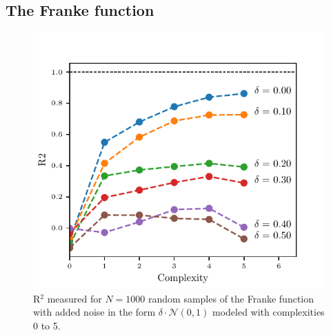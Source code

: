 \documentclass[reprint, english, nofootinbib]{revtex4-2}
\begin{document}
\subsection{The Franke function}

    \begin{figure}[h!tb]
        \center
        \includegraphics[width=\columnwidth]{OLS_R2_noise.pdf}
        \caption{R$^2$ measured for $N=1000$ random samples of the Franke function with added noise in the form $\delta \cdot \mathcal N(0, 1)$ modeled with complexities 0 to 5.}
    \end{figure}
\end{document}
